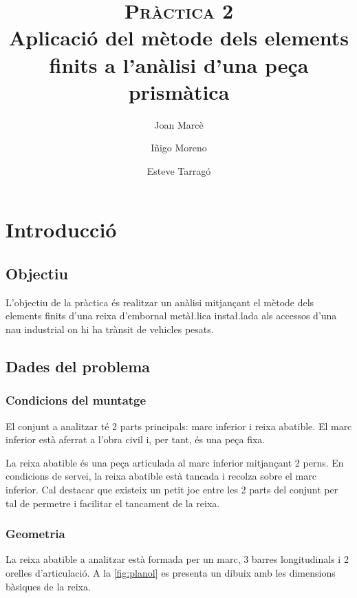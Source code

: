 \documentclass[a4paper]{article}
\title{\textsc{Pràctica 2} \\
	\normalsize Aplicació del mètode dels elements finits a l'anàlisi d'una peça prismàtica}
\author{Joan Marcè \and Iñigo Moreno \and Esteve Tarragó}
\date{}
\begin{document}
\maketitle

\section{Introducció}
\subsection{Objectiu}

L'objectiu de la pràctica és realitzar un anàlisi mitjançant el mètode dels elements finits d'una reixa d'embornal metà\l.lica insta\l.lada als accessos d'una nau industrial on hi ha trànsit de vehicles pesats.

\subsection{Dades del problema}
\subsubsection{Condicions del muntatge}
El conjunt a analitzar té 2 parts principals: marc inferior i reixa abatible. El marc inferior està aferrat a l'obra civil i, per tant, és una peça fixa.

La reixa abatible és una peça articulada al marc inferior mitjançant 2 perns. En condicions de servei, la reixa abatible està tancada i recolza sobre el marc inferior. Cal destacar que existeix un petit joc entre les 2 parts del conjunt per tal de permetre i facilitar el tancament de la reixa.

\subsubsection{Geometria}
La reixa abatible a analitzar està formada per un marc, 3 barres longitudinals i 2 orelles d'articulació. A la \autoref{fig:planol} es presenta un dibuix amb les dimensions bàsiques de la reixa.
\end{document}
